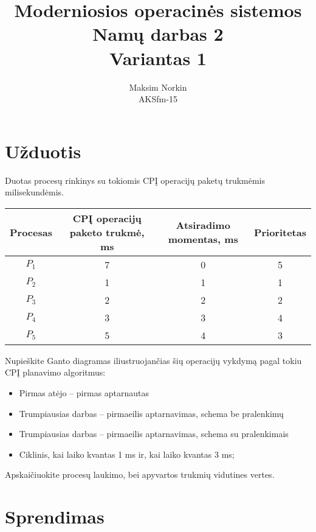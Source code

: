 \documentclass[11pt,a4paper]{article}
\title{Moderniosios operacinės sistemos\\Namų darbas 2\\Variantas 1}
\author{Maksim Norkin\\ AKSfm-15}
\begin{document}
    \maketitle

    \section{Užduotis}

    Duotas procesų rinkinys su tokiomis CPĮ operacijų paketų trukmėmis milisekundėmis.

    \begin{center}
        \begin{tabular}{|c|c|c|c|}
            \hline
            Procesas & CPĮ operacijų paketo trukmė, ms & Atsiradimo momentas, ms & Prioritetas \\ \hline
            $P_1$ & 7 & 0 & 5 \\ \hline
            $P_2$ & 1 & 1 & 1 \\ \hline
            $P_3$ & 2 & 2 & 2 \\ \hline
            $P_4$ & 3 & 3 & 4 \\ \hline
            $P_5$ & 5 & 4 & 3 \\ \hline
        \end{tabular}
    \end{center}

    Nupieškite Ganto diagramas iliustruojančias šių operacijų vykdymą pagal tokiu CPĮ planavimo algoritmus:

    \begin{itemize}
        \item Pirmas atėjo -- pirmas aptarnautas
        \item Trumpiausias darbas -- pirmaeilis aptarnavimas, schema be pralenkimų
        \item Trumpiausias darbas -- pirmaeilis aptarnavimas, schema su pralenkimais
        \item Ciklinis, kai laiko kvantas 1 ms ir, kai laiko kvantas 3 ms;
    \end{itemize}

    Apskaičiuokite procesų laukimo, bei apyvartos trukmių vidutines vertes.

    \section{Sprendimas}
\end{document}
